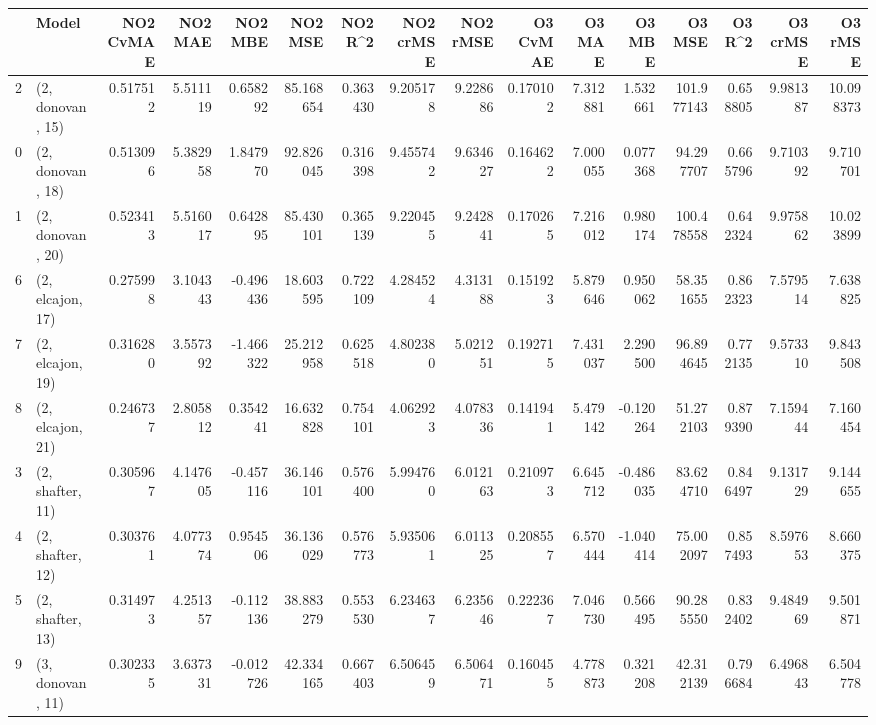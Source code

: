 \begin{tabular}{llrrrrrrrrrrrrrr}
\toprule
{} &             Model &  NO2 CvMAE &   NO2 MAE &   NO2 MBE &    NO2 MSE &   NO2 R\textasciicircum2 &  NO2 crMSE &  NO2 rMSE &  O3 CvMAE &    O3 MAE &    O3 MBE &      O3 MSE &    O3 R\textasciicircum2 &   O3 crMSE &    O3 rMSE \\
\midrule
2  &  (2, donovan, 15) &   0.517512 &  5.511119 &  0.658292 &  85.168654 &  0.363430 &   9.205178 &  9.228686 &  0.170102 &  7.312881 &  1.532661 &  101.977143 &  0.658805 &   9.981387 &  10.098373 \\
0  &  (2, donovan, 18) &   0.513096 &  5.382958 &  1.847970 &  92.826045 &  0.316398 &   9.455742 &  9.634627 &  0.164622 &  7.000055 &  0.077368 &   94.297707 &  0.665796 &   9.710392 &   9.710701 \\
1  &  (2, donovan, 20) &   0.523413 &  5.516017 &  0.642895 &  85.430101 &  0.365139 &   9.220455 &  9.242841 &  0.170265 &  7.216012 &  0.980174 &  100.478558 &  0.642324 &   9.975862 &  10.023899 \\
6  &  (2, elcajon, 17) &   0.275998 &  3.104343 & -0.496436 &  18.603595 &  0.722109 &   4.284524 &  4.313188 &  0.151923 &  5.879646 &  0.950062 &   58.351655 &  0.862323 &   7.579514 &   7.638825 \\
7  &  (2, elcajon, 19) &   0.316280 &  3.557392 & -1.466322 &  25.212958 &  0.625518 &   4.802380 &  5.021251 &  0.192715 &  7.431037 &  2.290500 &   96.894645 &  0.772135 &   9.573310 &   9.843508 \\
8  &  (2, elcajon, 21) &   0.246737 &  2.805812 &  0.354241 &  16.632828 &  0.754101 &   4.062923 &  4.078336 &  0.141941 &  5.479142 & -0.120264 &   51.272103 &  0.879390 &   7.159444 &   7.160454 \\
3  &  (2, shafter, 11) &   0.305967 &  4.147605 & -0.457116 &  36.146101 &  0.576400 &   5.994760 &  6.012163 &  0.210973 &  6.645712 & -0.486035 &   83.624710 &  0.846497 &   9.131729 &   9.144655 \\
4  &  (2, shafter, 12) &   0.303761 &  4.077374 &  0.954506 &  36.136029 &  0.576773 &   5.935061 &  6.011325 &  0.208557 &  6.570444 & -1.040414 &   75.002097 &  0.857493 &   8.597653 &   8.660375 \\
5  &  (2, shafter, 13) &   0.314973 &  4.251357 & -0.112136 &  38.883279 &  0.553530 &   6.234637 &  6.235646 &  0.222367 &  7.046730 &  0.566495 &   90.285550 &  0.832402 &   9.484969 &   9.501871 \\
9  &  (3, donovan, 11) &   0.302335 &  3.637331 & -0.012726 &  42.334165 &  0.667403 &   6.506459 &  6.506471 &  0.160455 &  4.778873 &  0.321208 &   42.312139 &  0.796684 &   6.496843 &   6.504778 \\

\end{tabular}

